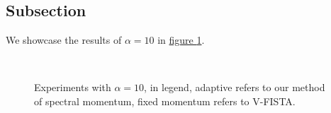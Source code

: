 \documentclass[]{article}
\theoremstyle{definition}
\numberwithin{equation}{subsection}
\begin{document}
    \subsection{Subsection}
        We showcase the results of $\alpha =10$ in \hyperref[fig:results1]{figure \ref*{fig:results1}}. 
        \begin{figure}[H]
            \centering
            \\
            \caption{Experiments with $\alpha = 10$, in legend, adaptive refers to our method of spectral momentum, fixed momentum refers to V-FISTA. }
            \label{fig:results1}
        \end{figure}
\end{document}

